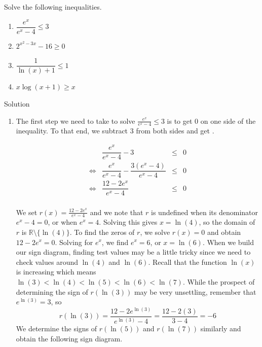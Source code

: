 \begin{example}  Solve the following inequalities. 
\label{expineq}
\begin{multicols}{2}

\begin{enumerate}
\item  $\dfrac{e^{x}}{e^{x}-4} \leq 3$

\item  $2^{x^2-3x} - 16 \geq 0$


\item  $\dfrac{1}{\ln(x)+1} \leq 1$

\item  $x \log(x+1) \geq x$

\end{enumerate}

\end{multicols}

Solution 

\begin{enumerate}


\item The first step we need to take to solve  $\frac{e^{x}}{e^{x}-4} \leq 3$ is to get $0$ on one side of the inequality. To that end, we subtract $3$ from both sides and get .


\setlength{\extrarowheight}{12pt}
\[ \begin{array}{rclr}


&\dfrac{e^{x}}{e^{x}-4} - 3 & \leq & 0 \\

\Leftrightarrow&\dfrac{e^{x}}{e^{x}-4} - \dfrac{3 \left(e^{x}-4\right)}{e^{x}-4} & \leq & 0  \\

\Leftrightarrow&\dfrac{12 - 2e^{x}}{e^{x}-4} & \leq & 0  \\

\end{array}\]
\setlength{\extrarowheight}{2pt}

We set $r(x) = \frac{12 - 2e^{x}}{e^{x}-4}$ and we note that $r$ is undefined when its denominator $e^{x}-4=0$, or when $e^{x} = 4$.  Solving this gives $x = \ln(4)$, so the domain of $r$ is $\mathbb{R}\setminus\{\ln(4)\}$. To find the zeros of $r$, we solve $r(x) = 0$ and obtain $12 - 2e^{x} = 0$.  Solving for $e^{x}$, we find $e^{x} = 6$, or $x = \ln(6)$.  When we build our sign diagram, finding test values may be a little tricky since we need to check values around $\ln(4)$ and $\ln(6)$.  Recall that the function $\ln(x)$ is increasing which means $\ln(3) < \ln(4) < \ln(5) < \ln(6) < \ln(7)$.  While the prospect of determining the sign of $r\left(\ln(3)\right)$ may be very unsettling, remember that $e^{\ln(3)} = 3$, so \[r\left(\ln(3)\right) = \frac{12 - 2e^{\ln(3)}}{e^{\ln(3)}-4} = \frac{12-2(3)}{3-4} = -6\]  We determine the signs of $r\left(\ln(5)\right)$ and $r\left(\ln(7)\right)$ similarly and obtain the following sign diagram.


\end{enumerate}
\end{example}
